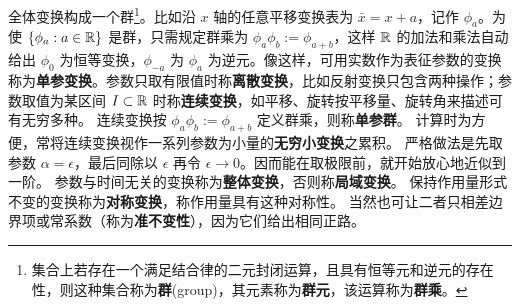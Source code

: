 全体变换构成一个群\footnote{集合上若存在一个满足结合律的二元封闭运算，且具有恒等元和逆元的存在性，则这种集合称为\textbf{群}(group)，其元素称为\textbf{群元}，该运算称为\textbf{群乘}。}。比如沿 $x$ 轴的任意平移变换表为 $\bar x=x+a$，记作 $\phi_a$。为使 $\{\phi_a:a\in\mathbb{R}\}$ 是群，只需规定群乘为 $\phi_a\phi_b:=\phi_{a+b}$，这样 $\mathbb{R}$ 的加法和乘法自动给出 $\phi_0$ 为恒等变换，$\phi_{-a}$ 为 $\phi_{a}$ 为逆元。像这样，可用实数作为表征参数的变换称为\textbf{单参变换}。参数只取有限值时称\textbf{离散变换}，比如反射变换只包含两种操作；参数取值为某区间 $I\subset\mathbb{R}$ 时称\textbf{连续变换}，如平移、旋转按平移量、旋转角来描述可有无穷多种。
连续变换按 $\phi_a\phi_b:=\phi_{a+b}$ 定义群乘，则称\textbf{单参群}。
计算时为方便，常将连续变换视作一系列参数为小量的\textbf{无穷小变换}之累积。
严格做法是先取参数 $\alpha=\epsilon$，最后同除以 $\epsilon$ 再令 $\epsilon\to 0$。因而能在取极限前，就开始放心地近似到一阶。
参数与时间无关的变换称为\textbf{整体变换}，否则称\textbf{局域变换}。
保持作用量形式不变的变换称为\textbf{对称变换}，称作用量具有这种对称性。
当然也可让二者只相差边界项或常系数（称为\textbf{准不变性}），因为它们给出相同正路。

